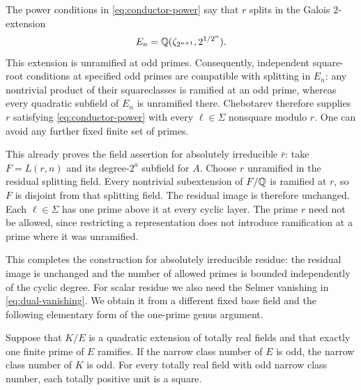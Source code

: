 The power conditions in \eqref{eq:conductor-power} say that $r$ splits
in the Galois $2$-extension
\[
 E_n=\mathbb Q(\zeta_{2^{n+1}},2^{1/2^n}).
\]
This extension is unramified at odd primes.  Consequently, independent
square-root conditions at specified odd primes are compatible with
splitting in $E_n$: any nontrivial product of their squareclasses is
ramified at an odd prime, whereas every quadratic subfield of $E_n$
is unramified there.  Chebotarev
\cite[Chapter~V, Theorem~3.23]{MilneCFT} therefore supplies $r$ satisfying
\eqref{eq:conductor-power} with every $\ell\in\Sigma$ nonsquare
modulo $r$.  One can avoid any further fixed finite set of primes.

This already proves the field assertion for absolutely irreducible
$\bar r$: take $F=L(r,n)$ and its degree-$2^a$ subfield for $A$.
Choose $r$ unramified in the residual splitting field.  Every nontrivial
subextension of $F/\mathbb Q$ is ramified at $r$, so $F$ is disjoint from
that splitting field.  The residual image is therefore unchanged.
Each $\ell\in\Sigma$ has one prime above it at every cyclic layer.
The prime $r$ need not be allowed, since restricting a representation
does not introduce ramification at a prime where it was unramified.

This completes the construction for absolutely irreducible residue:
the residual image is unchanged and the number of allowed primes is
bounded independently of the cyclic degree.  For scalar residue we
also need the Selmer vanishing in \eqref{eq:dual-vanishing}.  We obtain
it from a different fixed base field and the following elementary
form of the one-prime genus argument.

\begin{lemma}\label{lem:one-prime-genus}
Suppose that $K/E$ is a quadratic extension of totally real fields
and that exactly one finite prime of $E$ ramifies.  If the narrow
class number of $E$ is odd, the narrow class number of $K$ is odd.
For every totally real field with odd narrow class number, each
totally positive unit is a square.
\end{lemma}

